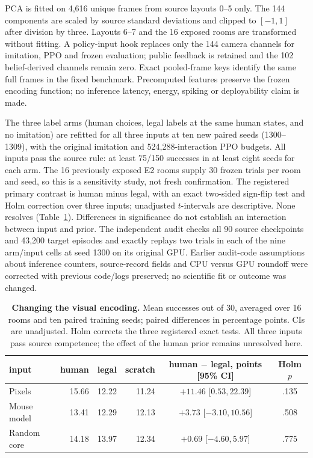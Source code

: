 \documentclass[10pt,onecolumn,letterpaper]{article}
\begin{document}
PCA is fitted on 4,616 unique frames from source layouts 0--5 only. The 144 components are scaled by source standard
deviations and clipped to $[-1,1]$ after division by three. Layouts 6--7 and the 16 exposed rooms are transformed
without fitting. A policy-input hook replaces only the 144 camera channels for imitation, PPO and frozen evaluation;
public feedback is retained and the 102 belief-derived channels remain zero. Exact pooled-frame keys identify the
same full frames in the fixed benchmark. Precomputed features preserve the frozen encoding function; no inference
latency, energy, spiking or deployability claim is made.

The three label arms (human choices, legal labels at the same human states, and no imitation) are refitted for all
three inputs at ten new paired seeds (1300--1309), with the original imitation and 524,288-interaction PPO budgets.
All inputs pass the source rule: at least 75/150 successes in at least eight seeds for each arm. The 16 previously
exposed E2 rooms supply 30 frozen trials per room and seed, so this is a sensitivity study, not fresh confirmation.
The registered primary contrast is human minus legal, with an exact two-sided sign-flip test and Holm correction
over three inputs; unadjusted $t$-intervals are descriptive. None resolves (Table~\ref{tab:microns}). Differences in
significance do not establish an interaction between input and prior. The independent audit checks all 90 source
checkpoints and 43,200 target episodes and exactly replays two trials in each of the nine arm/input cells at seed
1300 on its original GPU. Earlier audit-code assumptions about inference counters, source-record fields and CPU
versus GPU roundoff were corrected with previous code/logs preserved; no scientific fit or outcome was changed.

\begin{table}[ht]\centering\small
\begin{tabular}{lrrrcc}
\toprule
input & human & legal & scratch & human $-$ legal, points [95\% CI] & Holm $p$\\\midrule
Pixels & 15.66 & 12.22 & 11.24 & $+11.46$ [$0.53,22.39$] & .135\\
Mouse model & 13.41 & 12.29 & 12.13 & $+3.73$ [$-3.10,10.56$] & .508\\
Random core & 14.18 & 13.97 & 12.34 & $+0.69$ [$-4.60,5.97$] & .775\\
\bottomrule
\end{tabular}
\caption{\textbf{Changing the visual encoding.} Mean successes out of 30, averaged over 16 rooms and ten paired
training seeds; paired differences in percentage points. CIs are unadjusted. Holm corrects the three registered
exact tests. All three inputs pass source competence; the effect of the human prior remains unresolved here.}
\label{tab:microns}
\end{table}
\end{document}
